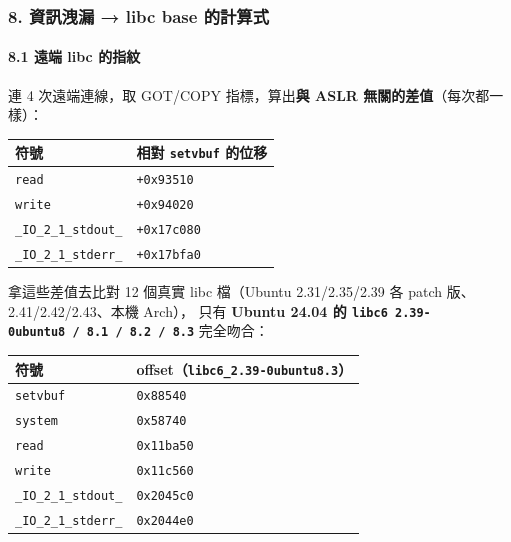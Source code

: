 \documentclass[10pt,a4paper]{article}
\newcounter{none}
\begin{document}
\subsubsection{8. 資訊洩漏 → libc base
的計算式}\label{ux8cc7ux8a0aux6d29ux6f0f-libc-base-ux7684ux8a08ux7b97ux5f0f}

\paragraph{8.1 遠端 libc
的指紋}\label{ux9060ux7aef-libc-ux7684ux6307ux7d0b}

連 4 次遠端連線，取 GOT/COPY 指標，算出\textbf{與 ASLR
無關的差值}（每次都一樣）：

{\def\LTcaptype{none} %
\begin{longtable}[]{@{}ll@{}}
\toprule\noalign{}
符號 & 相對 \texttt{setvbuf} 的位移 \\
\midrule\noalign{}
\endhead
\bottomrule\noalign{}
\endlastfoot
\texttt{read} & \texttt{+0x93510} \\
\texttt{write} & \texttt{+0x94020} \\
\texttt{\_\allowbreak{}IO\_\allowbreak{}2\_\allowbreak{}1\_\allowbreak{}stdout\_\allowbreak{}} & \texttt{+0x17c080} \\
\texttt{\_\allowbreak{}IO\_\allowbreak{}2\_\allowbreak{}1\_\allowbreak{}stderr\_\allowbreak{}} & \texttt{+0x17bfa0} \\
\end{longtable}
}

拿這些差值去比對 12 個真實 libc 檔（Ubuntu 2.31/2.35/2.39 各 patch
版、2.41/2.42/2.43、本機 Arch）， 只有 \textbf{Ubuntu 24.04 的
\texttt{libc6\ \allowbreak{}2.\allowbreak{}39-\allowbreak{}0ubuntu8\ \allowbreak{}/\allowbreak{}\ \allowbreak{}8.\allowbreak{}1\ \allowbreak{}/\allowbreak{}\ \allowbreak{}8.\allowbreak{}2\ \allowbreak{}/\allowbreak{}\ \allowbreak{}8.\allowbreak{}3}} 完全吻合：

{\def\LTcaptype{none} %
\begin{longtable}[]{@{}ll@{}}
\toprule\noalign{}
符號 & offset（\texttt{libc6\_\allowbreak{}2.\allowbreak{}39-\allowbreak{}0ubuntu8.\allowbreak{}3}） \\
\midrule\noalign{}
\endhead
\bottomrule\noalign{}
\endlastfoot
\texttt{setvbuf} & \texttt{0x88540} \\
\texttt{system} & \texttt{0x58740} \\
\texttt{read} & \texttt{0x11ba50} \\
\texttt{write} & \texttt{0x11c560} \\
\texttt{\_\allowbreak{}IO\_\allowbreak{}2\_\allowbreak{}1\_\allowbreak{}stdout\_\allowbreak{}} & \texttt{0x2045c0} \\
\texttt{\_\allowbreak{}IO\_\allowbreak{}2\_\allowbreak{}1\_\allowbreak{}stderr\_\allowbreak{}} & \texttt{0x2044e0} \\
\end{longtable}
}
\end{document}
